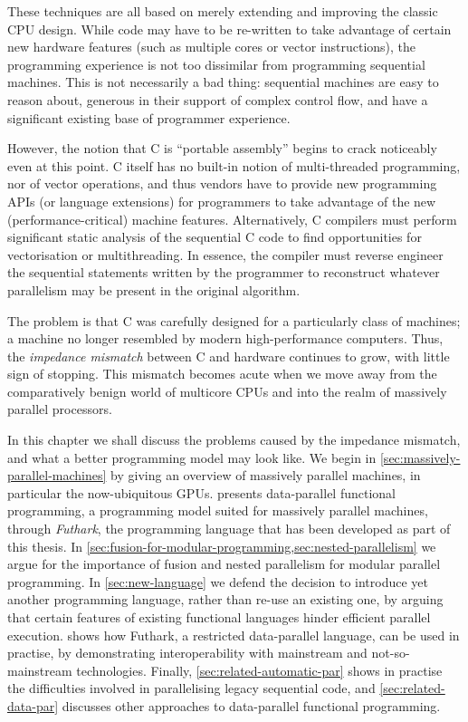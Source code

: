 These techniques are all based on merely extending and improving the
classic CPU design.  While code may have to be re-written to take
advantage of certain new hardware features (such as multiple cores or
vector instructions), the programming experience is not too dissimilar
from programming sequential machines.  This is not necessarily a bad
thing: sequential machines are easy to reason about, generous in their
support of complex control flow, and have a significant existing base
of programmer experience.

However, the notion that C is ``portable assembly'' begins to crack
noticeably even at this point.  C itself has no built-in notion of
multi-threaded programming, nor of vector operations, and thus vendors
have to provide new programming APIs (or language extensions) for
programmers to take advantage of the new (performance-critical)
machine features.  Alternatively, C compilers must perform significant
static analysis of the sequential C code to find opportunities for
vectorisation or multithreading.  In essence, the compiler must
reverse engineer the sequential statements written by the programmer
to reconstruct whatever parallelism may be present in the original
algorithm.

The problem is that C was carefully designed for a particularly class
of machines; a machine no longer resembled by modern high-performance
computers.  Thus, the \textit{impedance mismatch} between C and
hardware continues to grow, with little sign of stopping.  This
mismatch becomes acute when we move away from the comparatively benign
world of multicore CPUs and into the realm of massively parallel
processors.

In this chapter we shall discuss the problems caused by the impedance
mismatch, and what a better programming model may look like.  We begin
in \cref{sec:massively-parallel-machines} by giving an overview of
massively parallel machines, in particular the now-ubiquitous GPUs.
 presents data-parallel
functional programming, a programming model suited for massively
parallel machines, through \textit{Futhark}, the programming language
that has been developed as part of this thesis.  In
\cref{sec:fusion-for-modular-programming,sec:nested-parallelism} we
argue for the importance of fusion and nested parallelism for modular
parallel programming.  In \cref{sec:new-language} we defend the
decision to introduce yet another programming language, rather than
re-use an existing one, by arguing that certain features of existing
functional languages hinder efficient parallel execution.
 shows how Futhark, a restricted
data-parallel language, can be used in practise, by demonstrating
interoperability with mainstream and not-so-mainstream technologies.
Finally, \cref{sec:related-automatic-par} shows in practise the
difficulties involved in parallelising legacy sequential code, and
\cref{sec:related-data-par} discusses other approaches to
data-parallel functional programming.

